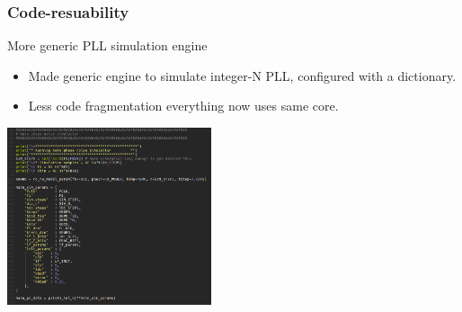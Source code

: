 \documentclass[t, screen, aspectratio=43]{beamer}
\begin{document}
\begin{frame}
	\frametitle{Code-resuability}
	\begin{block}{More generic PLL simulation engine}
		\begin{itemize}
			\scriptsize
			\item Made generic engine to simulate integer-N PLL, configured with a dictionary.
			\item Less code fragmentation everything now uses same core.
		\end{itemize}	
		\center\includegraphics[width=0.45\textwidth, angle=0]{simulation_setup.png}
	\end{block}
\end{frame}






\end{document}
